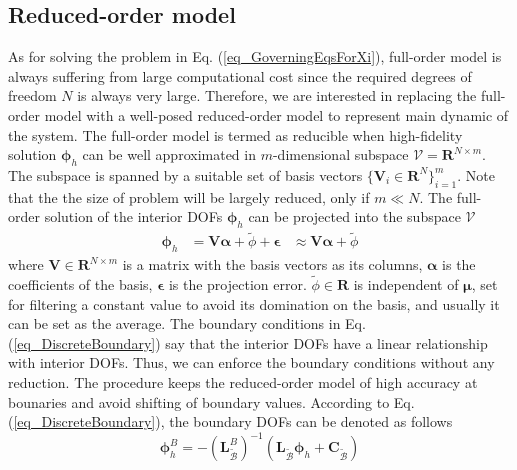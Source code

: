 \documentclass[preprint, 10pt]{elsarticle}
\begin{document}
\subsection{Reduced-order model}
\label{sec_ROM}
As for solving the problem in Eq. (\ref{eq_GoverningEqsForXi}), full-order model is always suffering from large computational cost since the required degrees of freedom $N$ is always very large.  Therefore, we are interested in replacing the full-order model with a well-posed  reduced-order model to represent main dynamic of the system. The full-order model is termed as reducible when high-fidelity solution $\pmb{\phi} _h$ can be well approximated in $m$-dimensional subspace $\mathcal{V}=\mathbf{R}^{N \times m}$. The subspace is spanned by a suitable set of basis vectors $\{\mathbf{V}_i \in \mathbf{R}^{N} \}_{i=1}^m$.  Note that the the size of problem will be largely reduced, only if $m \ll N$. The full-order solution of the interior DOFs $\pmb{\phi} _h$ can be projected into the subspace $\mathcal{V}$
\begin{equation}
\begin{aligned}
\pmb{\phi} _h  &   =   \mathbf{V} \pmb{\alpha} + \tilde{\phi} + \pmb{\epsilon}
               &\approx \mathbf{V} \pmb{\alpha} + \tilde{\phi}
\end{aligned}
\label{eq_projection}
\end{equation}
where $\mathbf{V} \in \mathbf{R}^{N\times m}$ is a matrix with the basis vectors as its columns, $\pmb{\alpha}$ is   the coefficients of the basis, $\pmb{\epsilon}$ is the projection error.  $\tilde{\phi} \in \mathbf{R}$ is independent of $\pmb{\mu}$, set for filtering a constant value to avoid its domination on the basis, and usually it can be set as the average. The boundary conditions in Eq. (\ref{eq_DiscreteBoundary}) say that the interior DOFs have a linear relationship with interior DOFs. Thus, we can enforce the boundary conditions without any reduction. The procedure keeps the reduced-order model of high accuracy at bounaries and avoid shifting of boundary values. According to Eq.(\ref{eq_DiscreteBoundary}), the boundary DOFs can be denoted as follows
\begin{equation}
\pmb{\phi}_h^{B} = -( \mathbf{L}_{\widetilde {\mathcal{B}}}^{B} )^{-1}
\left(
\mathbf{L}_{\widetilde {\mathcal{B}}} \pmb{\phi}_h +
\mathbf{C}_{\widetilde {\mathcal{B}}}
\right)
\label{eq_DerivePhiB}
\end{equation}
\end{document}
